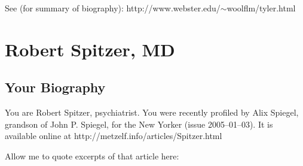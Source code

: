 See (for summary of biography): http:\slash \slash www.webster.edu\slash \ensuremath{\sim}woolflm\slash tyler.html

\chapter{Robert Spitzer, MD}
\label{robertspitzermd}

\section{Your Biography}
\label{yourbiography}

You are Robert Spitzer, psychiatrist. You were recently profiled by Alix Spiegel, grandson of John P. Spiegel, for the New Yorker (issue 2005--01--03). It is available online at http:\slash \slash metzelf.info\slash articles\slash Spitzer.html

Allow me to quote excerpts of that article here:

